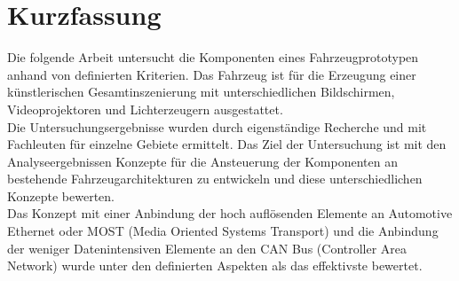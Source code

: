 \chapter*{Kurzfassung} %
Die folgende Arbeit untersucht die Komponenten eines Fahrzeugprototypen anhand von definierten Kriterien. Das Fahrzeug ist für die Erzeugung einer künstlerischen Gesamtinszenierung mit unterschiedlichen Bildschirmen, Videoprojektoren und Lichterzeugern ausgestattet. \\
Die Untersuchungsergebnisse wurden durch eigenständige Recherche und mit Fachleuten für einzelne Gebiete ermittelt. Das Ziel der Untersuchung ist mit den Analyseergebnissen Konzepte für die Ansteuerung der Komponenten an bestehende Fahrzeugarchitekturen zu entwickeln und diese unterschiedlichen Konzepte bewerten. \\
Das Konzept mit einer Anbindung der hoch auflösenden Elemente an Automotive Ethernet oder MOST (Media Oriented Systems Transport) und die Anbindung der weniger Datenintensiven Elemente an den CAN Bus (Controller Area Network) wurde unter den definierten Aspekten als das effektivste bewertet.
\cleardoublepage
